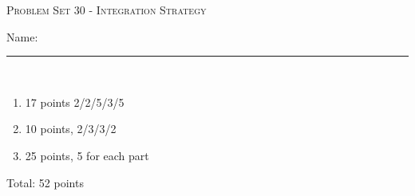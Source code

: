\documentclass{article}
\begin{document}
\begin{center}
  \large\textsc{Problem Set 30 - Integration Strategy}
  
      \pspace{12pt}
  \begin{problemonly}\large Name: \rule{5cm}{0.15mm}\\ \end{problemonly}
\end{center}

\begin{grading}
    \begin{enumerate}
        \item 17 points 2/2/5/3/5
        \item 10 points, 2/3/3/2
        \item 25 points, 5 for each part
    \end{enumerate}
    Total: 52 points
\end{grading}
\end{document}
